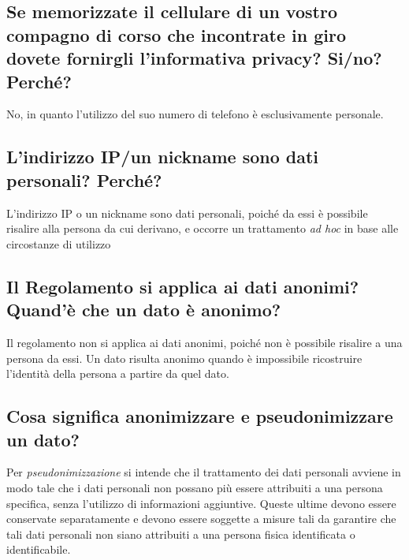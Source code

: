 \subsection{Se memorizzate il cellulare di un vostro compagno di corso che incontrate in giro dovete fornirgli
l’informativa privacy? Si/no? Perché?}
No, in quanto l'utilizzo del suo numero di telefono è esclusivamente personale.

\subsection{L'indirizzo IP/un nickname sono dati personali? Perché?}
L'indirizzo IP o un nickname sono dati personali, poiché da essi è possibile risalire alla persona da cui derivano, e occorre un trattamento \textit{ad hoc} in base alle circostanze di utilizzo

\subsection{Il Regolamento si applica ai dati anonimi? Quand'è che un dato è anonimo?}
Il regolamento non si applica ai dati anonimi, poiché non è possibile risalire a una persona da essi.
Un dato risulta anonimo quando è impossibile ricostruire l'identità della persona a partire da quel dato.

\subsection{Cosa significa anonimizzare e pseudonimizzare un dato?}
Per \textit{pseudonimizzazione} si intende che il trattamento dei dati personali avviene in modo tale che i dati personali non possano più essere attribuiti a una persona specifica, senza l'utilizzo di informazioni aggiuntive. Queste ultime devono essere conservate separatamente e devono essere soggette a misure tali da garantire che tali dati personali non siano attribuiti a una persona fisica identificata o identificabile.

